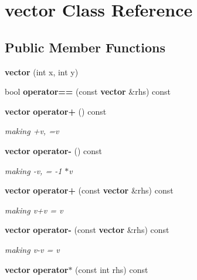 \section{vector Class Reference}
\label{classvector}
\subsection*{Public Member Functions}
\begin{DoxyCompactItemize}
\item 
{\bfseries vector} (int x, int y)\label{classvector_a7fa147d3199381b9d8b32753bd1a6968}

\item 
bool {\bfseries operator==} (const {\bf vector} \&rhs) const \label{classvector_a3fafaffe7fdcc82cb9bd2cf53d933c1c}

\item 
{\bf vector} {\bf operator+} () const \label{classvector_a45841e6143c208ca3bca6a5bdc0e5c68}

\begin{DoxyCompactList}\small\item\em making +v, =v \end{DoxyCompactList}\item 
{\bf vector} {\bf operator-\/} () const \label{classvector_a76c9828af6fbf6d389ef75e20270efed}

\begin{DoxyCompactList}\small\item\em making -\/v, = -\/1 $\ast$v \end{DoxyCompactList}\item 
{\bf vector} {\bf operator+} (const {\bf vector} \&rhs) const \label{classvector_a2ab7f62262c6f0c6ade3bd1879e6001e}

\begin{DoxyCompactList}\small\item\em making v+v = v \end{DoxyCompactList}\item 
{\bf vector} {\bf operator-\/} (const {\bf vector} \&rhs) const \label{classvector_ad9596a53b6aef33bbddfa7b9b4b17f09}

\begin{DoxyCompactList}\small\item\em making v-\/v = v \end{DoxyCompactList}\item 
{\bf vector} {\bf operator$\ast$} (const int rhs) const \label{classvector_a07aa14ad63e3f0281c1af5ef594b0a12}


\end{DoxyCompactItemize}
